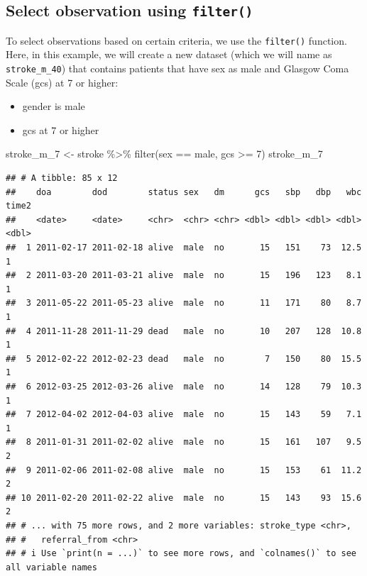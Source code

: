 \documentclass[
  10pt,
]{krantz}
\newenvironment{Shaded}{\begin{snugshade}}{\end{snugshade}}
\newcommand{\DecValTok}[1]{\textcolor[rgb]{0.00,0.00,0.81}{#1}}
\newcommand{\FunctionTok}[1]{\textcolor[rgb]{0.00,0.00,0.00}{#1}}
\newcommand{\NormalTok}[1]{#1}
\newcommand{\OtherTok}[1]{\textcolor[rgb]{0.56,0.35,0.01}{#1}}
\newcommand{\SpecialCharTok}[1]{\textcolor[rgb]{0.00,0.00,0.00}{#1}}
\newcommand{\StringTok}[1]{\textcolor[rgb]{0.31,0.60,0.02}{#1}}
\providecommand{\tightlist}{%
  \setlength{\itemsep}{0pt}\setlength{\parskip}{0pt}}
\begin{document}
\hypertarget{select-observation-using-filter}{%
\subsection{\texorpdfstring{Select observation using \texttt{filter()}}{Select observation using filter()}}\label{select-observation-using-filter}}

To select observations based on certain criteria, we use the \texttt{filter()} function. Here, in this example, we will create a new dataset (which we will name as \texttt{stroke\_m\_40}) that contains patients that have sex as male and Glasgow Coma Scale (gcs) at 7 or higher:

\begin{itemize}
\tightlist
\item
  gender is male
\item
  gcs at 7 or higher
\end{itemize}

\begin{Shaded}
\begin{Highlighting}[]
\NormalTok{stroke\_m\_7 }\OtherTok{\textless{}{-}}\NormalTok{ stroke }\SpecialCharTok{\%\textgreater{}\%} \FunctionTok{filter}\NormalTok{(sex }\SpecialCharTok{==} \StringTok{\textquotesingle{}male\textquotesingle{}}\NormalTok{, gcs }\SpecialCharTok{\textgreater{}=} \DecValTok{7}\NormalTok{)}
\NormalTok{stroke\_m\_7}
\end{Highlighting}
\end{Shaded}

\begin{verbatim}
## # A tibble: 85 x 12
##    doa        dod        status sex   dm      gcs   sbp   dbp   wbc time2
##    <date>     <date>     <chr>  <chr> <chr> <dbl> <dbl> <dbl> <dbl> <dbl>
##  1 2011-02-17 2011-02-18 alive  male  no       15   151    73  12.5     1
##  2 2011-03-20 2011-03-21 alive  male  no       15   196   123   8.1     1
##  3 2011-05-22 2011-05-23 alive  male  no       11   171    80   8.7     1
##  4 2011-11-28 2011-11-29 dead   male  no       10   207   128  10.8     1
##  5 2012-02-22 2012-02-23 dead   male  no        7   150    80  15.5     1
##  6 2012-03-25 2012-03-26 alive  male  no       14   128    79  10.3     1
##  7 2012-04-02 2012-04-03 alive  male  no       15   143    59   7.1     1
##  8 2011-01-31 2011-02-02 alive  male  no       15   161   107   9.5     2
##  9 2011-02-06 2011-02-08 alive  male  no       15   153    61  11.2     2
## 10 2011-02-20 2011-02-22 alive  male  no       15   143    93  15.6     2
## # ... with 75 more rows, and 2 more variables: stroke_type <chr>,
## #   referral_from <chr>
## # i Use `print(n = ...)` to see more rows, and `colnames()` to see all variable names
\end{verbatim}
\end{document}
